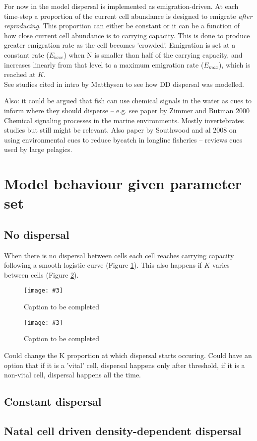 \documentclass{article}
\newcommand{\addcenterfig}[3][Caption to be completed]{
  \begin{figure}[!h]
    \begin{center}
      \texttt{[image: \#3]}
     \caption{#1 \label{#2}}
    \end{center}
  \end{figure}
}
\begin{document}
For now in the model dispersal is implemented as emigration-driven. At
each time-step a proportion of the current cell abundance is designed
to emigrate \emph{after reproducing}. This proportion can either be
constant or it can be a function of how close current cell abundance
is to carrying capacity. This is done to produce greater emigration
rate as the cell becomes 'crowded'. Emigration is set at a constant
rate ($E_{base}$) when N is smaller than half of the carrying capacity, and
increases linearly from that level to a maximum emigration rate
($E_{max}$), which is reached at $K$.\\

See studies cited in intro by Matthysen to see how DD dispersal was
modelled.

Also: it could be argued that fish can use chemical signals in the
water as cues to inform where they should disperse -- e.g. see paper
by Zimmer and Butman 2000 Chemical signaling processes in the marine
environments. Mostly invertebrates studies but still might be
relevant. Also paper by Southwood and al 2008 on using environmental
cues to reduce bycatch in longline fisheries -- reviews cues used by
large pelagics.

\section{Model behaviour given parameter set}
\subsection{No dispersal}
When there is no dispersal between cells each cell reaches carrying
capacity following a smooth logistic curve (Figure \ref{nodisp}). This
also happens if $K$ varies between cells (Figure \ref{nodisp-core}).

\addcenterfig{nodisp}{Theo-mod_range-contrxn_emigbase-0_emigmax-0_habtype-even.pdf}
\addcenterfig{nodisp-core}{Theo-mod_range-contrxn_emigbase-0_emigmax-0_habtype-core.pdf}

Could change the K proportion at which dispersal starts occuring.
Could have an option that if it is a 'vital' cell, dispersal happens
only after threshold, if it is a non-vital cell, dispersal happens all
the time.
\subsection{Constant dispersal}


\subsection{Natal cell driven density-dependent dispersal}
\end{document}
